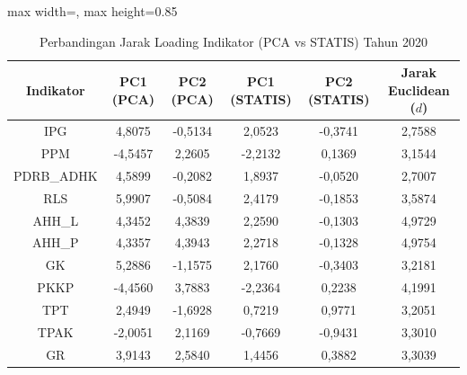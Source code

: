 \begin{table}[H]
\centering
\caption{Perbandingan Jarak Loading Indikator (PCA vs STATIS) Tahun 2020} \label{tab:app2jarak_loading_2020}
\begin{adjustbox}{max width=\textwidth, max height=0.85\textheight}
\begin{tabular}{|c|c|c|c|c|c|}
\hline
\textbf{Indikator} & \textbf{PC1 (PCA)} & \textbf{PC2 (PCA)} & \textbf{PC1 (STATIS)} & \textbf{PC2 (STATIS)} & \textbf{Jarak Euclidean ($d$)} \\
\hline
IPG & 4,8075 & -0,5134 & 2,0523 & -0,3741 & 2,7588 \\
PPM & -4,5457 & 2,2605 & -2,2132 & 0,1369 & 3,1544 \\
PDRB\_ADHK & 4,5899 & -0,2082 & 1,8937 & -0,0520 & 2,7007 \\
RLS & 5,9907 & -0,5084 & 2,4179 & -0,1853 & 3,5874 \\
AHH\_L & 4,3452 & 4,3839 & 2,2590 & -0,1303 & 4,9729 \\
AHH\_P & 4,3357 & 4,3943 & 2,2718 & -0,1328 & 4,9754 \\
GK & 5,2886 & -1,1575 & 2,1760 & -0,3403 & 3,2181 \\
PKKP & -4,4560 & 3,7883 & -2,2364 & 0,2238 & 4,1991 \\
TPT & 2,4949 & -1,6928 & 0,7219 & 0,9771 & 3,2051 \\
TPAK & -2,0051 & 2,1169 & -0,7669 & -0,9431 & 3,3010 \\
GR & 3,9143 & 2,5840 & 1,4456 & 0,3882 & 3,3039 \\
\hline
\end{tabular}
\end{adjustbox}
\end{table}